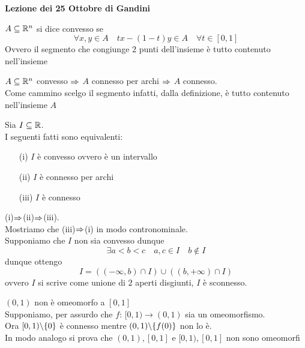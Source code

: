 


\textbf{Lezione dei 25 Ottobre di Gandini }
\begin{defn}[Convesso]\bianco
$A\subseteq \mathbb{R}^n$ si dice convesso se 
$$ \forall x,y \in A \quad tx-(1-t)y \in A \quad \forall t \in [0,1]$$
Ovvero il segmento che congiunge $2$ punti dell'insieme \`e tutto contenuto nell'insieme
\end{defn}
\begin{oss}$A\subseteq \mathbb{R}^n $ convesso $\Rightarrow $ $A$ connesso per archi $\Rightarrow$ $A$ connesso.\\
Come cammino scelgo il segmento infatti, dalla definizione, \`e tutto contenuto nell'insieme $A$
\end{oss}
\spazio

\begin{prop}Sia $I \subseteq \mathbb{R}$.\\
I seguenti fatti sono equivalenti:
\begin{enumerate}
\item[(i)]$I$ \`e convesso ovvero \`e un intervallo
\item[(ii)] $I$ \`e connesso per archi
\item[(iii)] $I$ \`e connesso
\end{enumerate}
\proof (i)$\Rightarrow$(ii)$\Rightarrow$(iii).\\
Mostriamo che (iii)$\Rightarrow$(i) in modo contronominale.\\
Supponiamo che $I$ non sia convesso dunque 
$$ \exists a<b<c \quad a,c\in I \quad b \not \in I $$
dunque ottengo
$$ I = ( (-\infty, b) \cap I ) \cup ( (b,+\infty)\cap I)$$
ovvero $I$ si scrive come unione di $2$ aperti disgiunti, $I$ \`e sconnesso.
\endproof
\end{prop}
\begin{ese}$(0,1)$ non \`e omeomorfo a $[0,1]$ \\
Supponiamo, per assurdo che $f:\, [0,1) \to (0,1)$ sia un omeomorfismo.\\
Ora $[0,1) \backslash \{ 0 \} $ \`e connesso mentre $(0,1) \backslash \{ f(0)\}$ non lo \`e.\\
In modo analogo si prova che $(0,1), [0,1]$ e $[0,1), [0,1]$ non sono omeomorfi
\end{ese}
\spazio
